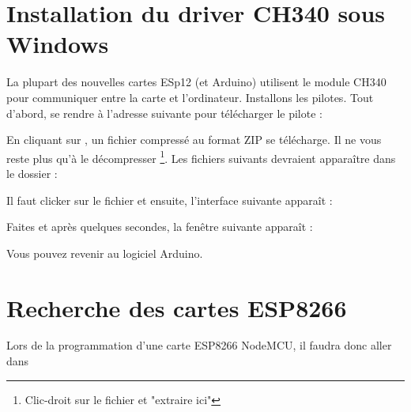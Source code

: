 \section{Installation du driver CH340 sous Windows}

La plupart des nouvelles cartes ESp12 (et Arduino) utilisent le module CH340 pour communiquer entre la carte et l'ordinateur.
Installons les pilotes. Tout d'abord, se rendre à l'adresse suivante pour télécharger le pilote :


En cliquant sur , un fichier compressé au format ZIP se télécharge. Il ne vous reste plus 
qu'à le décompresser \footnote{Clic-droit sur le fichier et "extraire ici"}.
Les fichiers suivants devraient apparaître dans le dossier : 


Il faut clicker sur le fichier  et ensuite, l'interface suivante apparaît : 


Faites  et après quelques secondes, la fenêtre suivante apparaît : 


Vous pouvez revenir au logiciel Arduino.

\section{Recherche des cartes ESP8266}


Lors de la programmation d'une carte ESP8266 NodeMCU, il faudra donc aller dans \\



